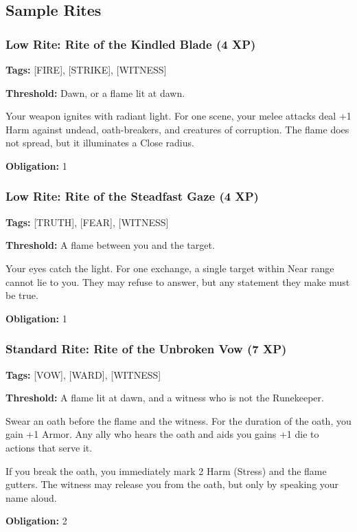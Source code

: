 \subsection{Sample Rites}

\subsubsection{Low Rite: Rite of the Kindled Blade (4 XP)}

\textbf{Tags:} [FIRE], [STRIKE], [WITNESS]

\textbf{Threshold:} Dawn, or a flame lit at dawn.

Your weapon ignites with radiant light. For one scene, your melee attacks deal +1 Harm against undead, oath-breakers, and creatures of corruption. The flame does not spread, but it illuminates a Close radius.

\textbf{Obligation:} 1

\subsubsection{Low Rite: Rite of the Steadfast Gaze (4 XP)}

\textbf{Tags:} [TRUTH], [FEAR], [WITNESS]

\textbf{Threshold:} A flame between you and the target.

Your eyes catch the light. For one exchange, a single target within Near range cannot lie to you. They may refuse to answer, but any statement they make must be true.

\textbf{Obligation:} 1

\subsubsection{Standard Rite: Rite of the Unbroken Vow (7 XP)}

\textbf{Tags:} [VOW], [WARD], [WITNESS]

\textbf{Threshold:} A flame lit at dawn, and a witness who is not the Runekeeper.

Swear an oath before the flame and the witness. For the duration of the oath, you gain +1 Armor. Any ally who hears the oath and aids you gains +1 die to actions that serve it.

If you break the oath, you immediately mark 2 Harm (Stress) and the flame gutters. The witness may release you from the oath, but only by speaking your name aloud.

\textbf{Obligation:} 2

